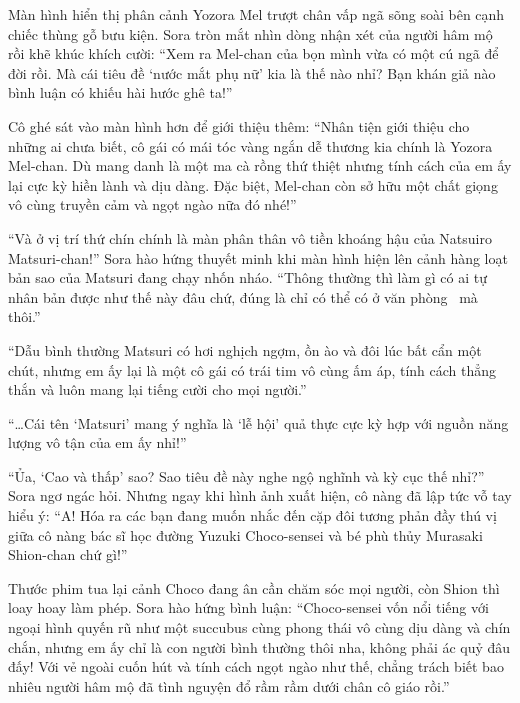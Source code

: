 \documentclass[../main.tex]{subfiles}
\begin{document}


Màn hình hiển thị phân cảnh Yozora Mel trượt chân vấp ngã sõng soài bên cạnh chiếc thùng gỗ bưu kiện. Sora tròn mắt nhìn dòng nhận xét của người hâm mộ rồi khẽ khúc khích cười: ``Xem ra Mel-chan của bọn mình vừa có một cú ngã để đời rồi. Mà cái tiêu đề `nước mắt phụ nữ' kia là thế nào nhỉ? Bạn khán giả nào bình luận có khiếu hài hước ghê ta!''


Cô ghé sát vào màn hình hơn để giới thiệu thêm: ``Nhân tiện giới thiệu cho những ai chưa biết, cô gái có mái tóc vàng ngắn dễ thương kia chính là Yozora Mel-chan. Dù mang danh là một ma cà rồng thứ thiệt nhưng tính cách của em ấy lại cực kỳ hiền lành và dịu dàng. Đặc biệt, Mel-chan còn sở hữu một chất giọng vô cùng truyền cảm và ngọt ngào nữa đó nhé!''

\il



``Và ở vị trí thứ chín chính là màn phân thân vô tiền khoáng hậu của Natsuiro Matsuri-chan!'' Sora hào hứng thuyết minh khi màn hình hiện lên cảnh hàng loạt bản sao của Matsuri đang chạy nhốn nháo. ``Thông thường thì làm gì có ai tự nhân bản được như thế này đâu chứ, đúng là chỉ có thể có ở văn phòng \hll\ mà thôi.''


``Dẫu bình thường Matsuri có hơi nghịch ngợm, ồn ào và đôi lúc bất cẩn một chút, nhưng em ấy lại là một cô gái có trái tim vô cùng ấm áp, tính cách thẳng thắn và luôn mang lại tiếng cười cho mọi người.''


``\dots Cái tên `Matsuri' mang ý nghĩa là `lễ hội' quả thực cực kỳ hợp với nguồn năng lượng vô tận của em ấy nhỉ!''

\il


``Ủa, `Cao và thấp' sao? Sao tiêu đề này nghe ngộ nghĩnh và kỳ cục thế nhỉ?'' Sora ngơ ngác hỏi. Nhưng ngay khi hình ảnh xuất hiện, cô nàng đã lập tức vỗ tay hiểu ý: ``A! Hóa ra các bạn đang muốn nhắc đến cặp đôi tương phản đầy thú vị giữa cô nàng bác sĩ học đường Yuzuki Choco-sensei và bé phù thủy Murasaki Shion-chan chứ gì!''


Thước phim tua lại cảnh Choco đang ân cần chăm sóc mọi người, còn Shion thì loay hoay làm phép. Sora hào hứng bình luận: ``Choco-sensei vốn nổi tiếng với ngoại hình quyến rũ như một succubus cùng phong thái vô cùng dịu dàng và chín chắn, nhưng em ấy chỉ là con người bình thường thôi nha, không phải ác quỷ đâu đấy! Với vẻ ngoài cuốn hút và tính cách ngọt ngào như thế, chẳng trách biết bao nhiêu người hâm mộ đã tình nguyện đổ rầm rầm dưới chân cô giáo rồi.''
\end{document}
